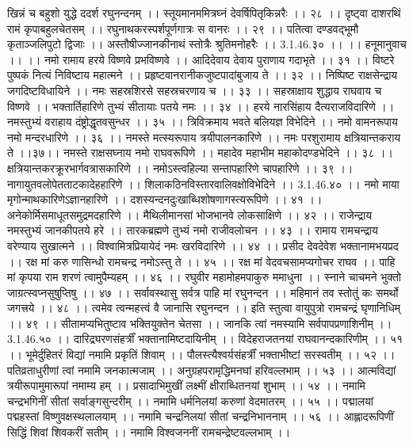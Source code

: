 खिन्नं च बहुशो युद्धे ददर्श रघुनन्दनम् ।।
स्तूयमानममित्रघ्नं देवर्षिपितृकिन्नरैः ।। २८ ।।
दृष्ट्वा दाशरथिं रामं कृपाबहुलचेतसम् ।।
रघुनाथकरस्पर्शपूर्णगात्रः स वानरः ।। २९ ।।
पतित्वा दण्डवद्भूमौ कृताञ्जलिपुटो द्विजाः ।।
अस्तौषीज्जानकीनाथं स्तोत्रैः श्रुतिमनोहरैः ।। 3.1.46.३० ।।
।। हनूमानुवाच ।। ।।
नमो रामाय हरये विष्णवे प्रभविष्णवे ।।
आदिदेवाय देवाय पुराणाय गदाभृते ।। ३१ ।।
विष्टरे पुष्पकं नित्यं निविष्टाय महात्मने ।।
प्रहृष्टवानरानीकजुष्टपादांबुजाय ते ।। ३२ ।।
निष्पिष्ट राक्षसेन्द्राय जगदिष्टविधायिने ।।
नमः सहस्रशिरसे सहस्रचरणाय च ।। ३३ ।।
सहस्राक्षाय शुद्धाय राघवाय च विष्णवे ।।
भक्तार्तिहारिणे तुभ्यं सीतायाः पतये नमः ।। ३४ ।।
हरये नारसिंहाय दैत्यराजविदारिणे ।।
नमस्तुभ्यं वराहाय दंष्ट्रोद्धृतवसुन्धर ।। ३५ ।।
त्रिविक्रमाय भवते बलियज्ञ विभेदिने ।।
नमो वामनरूपाय नमो मन्दरधारिणे ।। ३६ ।।
नमस्ते मत्स्यरूपाय त्रयीपालनकारिणे ।।
नमः परशुरामाय क्षत्रियान्तकराय ते ।।३७।।
नमस्ते राक्षसघ्नाय नमो राघवरूपिणे ।।
महादेव महाभीम महाकोदण्डभेदिने ।। ३८ ।।
क्षत्रियान्तकरक्रूरभार्गवत्रासकारिणे ।।
नमोऽस्त्वहिल्या सन्तापहारिणे चापहारिणे ।। ३९ ।।
नागायुतवलोपेतताटकादेहहारिणे ।।
शिलाकठिनविस्तारवालिवक्षोविभेदिने ।। 3.1.46.४० ।।
नमो माया मृगोन्माथकारिणेऽज्ञानहारिणे ।।
दशस्यन्दनदुःखाब्धिशोषणागस्त्यरूपिणे ।। ४१ ।।
अनेकोर्मिसमाधूतसमुद्रमदहारिणे ।।
मैथिलीमानसां भोजभानवे लोकसाक्षिणे ।। ४२ ।।
राजेन्द्राय नमस्तुभ्यं जानकीपतये हरे ।।
तारकब्रह्मणे तुभ्यं नमो राजीवलोचन ।। ४३ ।।
रामाय रामचन्द्राय वरेण्याय सुखात्मने ।।
विश्वामित्रप्रियायेदं नमः खरविदारिणे ।। ४४ ।।
प्रसीद देवदेवेश भक्तानामभयप्रद ।।
रक्ष मां करु णासिन्धो रामचन्द्र नमोऽस्तु ते ।। ४५ ।।
रक्ष मां वेदवचसामप्यगोचर राघव ।।
पाहि मां कृपया राम शरणं त्वामुपैम्यहम् ।। ४६ ।।
रघुवीर महामोहमपाकुरु ममाधुना ।।
स्नाने चाचमने भुक्तो जाग्रत्स्वप्नसुषुप्तिषु ।। ४७ ।।
सर्वावस्थासु सर्वत्र पाहि मां रघुनन्दन ।।
महिमानं तव स्तोतुं कः समर्थो जगत्त्रये ।। ४८ ।।
त्वमेव त्वन्महत्त्वं वै जानासि रघुनन्दन ।।
इति स्तुत्वा वायुपुत्रो रामचन्द्रं घृणानिधिम् ।। ४९ ।।
सीतामप्यभितुष्टाव भक्तियुक्तेन चेतसा ।।
जानकि त्वां नमस्यामि सर्वपापप्रणाशिनीम् ।। 3.1.46.५० ।।
दारिद्र्यरणसंहर्त्रीं भक्तानामिष्टदायिनीम् ।।
विदेहराजतनयां राघवानन्दकारिणीम् ।। ५१ ।।
भूमेर्दुहितरं विद्यां नमामि प्रकृतिं शिवाम् ।।
पौलस्त्यैश्वर्यसंहर्त्रीं भक्ताभीष्टां सरस्वतीम् ।। ५२ ।।
पतिव्रताधुरीणां त्वां नमामि जनकात्मजाम् ।।
अनुग्रहपरामृद्धिमनघां हरिवल्लभाम् ।। ५३ ।।
आत्मविद्यां त्रयीरूपामुमारूपां नमाम्य हम् ।।
प्रसादाभिमुखीं लक्ष्मीं क्षीराब्धितनयां शुभाम् ।। ५४ ।।
नमामि चन्द्रभगिनीं सीतां सर्वाङ्गसुन्दरीम् ।।
नमामि धर्मनिलयां करुणां वेदमातरम् ।। ५५ ।।
पद्मालयां पद्महस्तां विष्णुवक्षस्थलालयाम् ।।
नमामि चन्द्रनिलयां सीतां चन्द्रनिभाननाम् ।। ५६ ।।
आह्लादरूपिणीं सिद्धिं शिवां शिवकरीं सतीम् ।।
नमामि विश्वजननीं रामचन्द्रेष्टवल्लभाम् ।।
